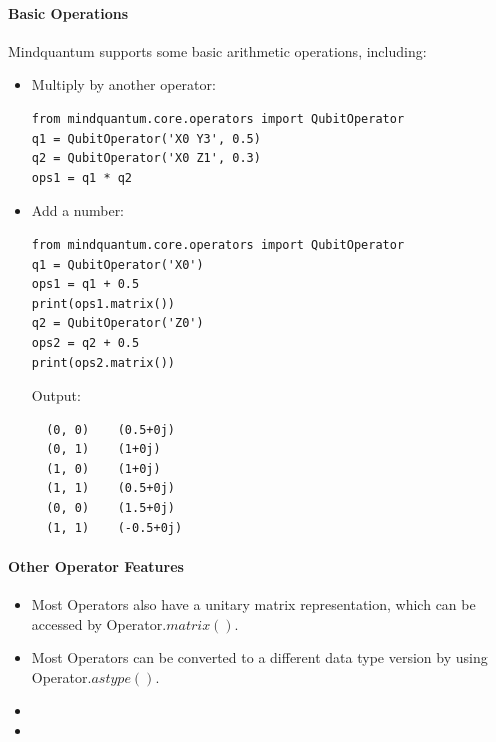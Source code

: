 \paragraph{Basic Operations}
Mindquantum supports some basic arithmetic operations, including:
\begin{itemize}
    \item Multiply by another operator:
          \begin{lstlisting}
from mindquantum.core.operators import QubitOperator
q1 = QubitOperator('X0 Y3', 0.5)
q2 = QubitOperator('X0 Z1', 0.3)
ops1 = q1 * q2
    \end{lstlisting}
    \item Add a number:
          \begin{lstlisting}
from mindquantum.core.operators import QubitOperator
q1 = QubitOperator('X0')
ops1 = q1 + 0.5
print(ops1.matrix())
q2 = QubitOperator('Z0')
ops2 = q2 + 0.5
print(ops2.matrix())
    \end{lstlisting}
          Output:
          \begin{lstlisting}
  (0, 0)	(0.5+0j)
  (0, 1)	(1+0j)
  (1, 0)	(1+0j)
  (1, 1)	(0.5+0j)
  (0, 0)	(1.5+0j)
  (1, 1)	(-0.5+0j)
\end{lstlisting}
\end{itemize}

\paragraph{Other Operator Features}
\begin{itemize}
    \item Most Operators also have a unitary matrix representation, which can be accessed by Operator.$matrix()$.
    \item Most Operators can be converted to a different data type version by using Operator.$astype()$.
    \item
    \item
\end{itemize}

